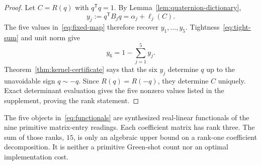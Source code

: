 \begin{proof}
Let $C=R(q)$ with $q^\mathsf Tq=1$.  By
Lemma~\ref{lem:quaternion-dictionary},
\begin{equation}\label{eq:y-readings}
 y_j:=q^\mathsf TB_jq=\alpha_j+\ell_j(C).
\end{equation}
The five values in~\eqref{eq:fixed-map} therefore recover
$y_1,\ldots,y_5$.  Tightness~\eqref{eq:tight-sum} and unit norm give
\begin{equation}\label{eq:sixth-recovery}
 y_6=1-\sum_{j=1}^5y_j.
\end{equation}
Theorem~\ref{thm:kernel-certificate} says that the six $y_j$ determine $q$
up to the unavoidable sign $q\sim-q$.  Since $R(q)=R(-q)$, they determine
$C$ uniquely.  Exact determinant evaluation gives the five nonzero values
listed in the supplement, proving the rank statement.
\end{proof}

\begin{remark}\label{rem:not-shots}
The five objects in~\eqref{eq:functionals} are synthesized real-linear
functionals of the nine primitive matrix-entry readings.  Each coefficient
matrix has rank three.  The sum of those ranks, $15$, is only an algebraic
upper bound on a rank-one coefficient decomposition.  It is neither a
primitive Green-shot count nor an optimal implementation cost.
\end{remark}

